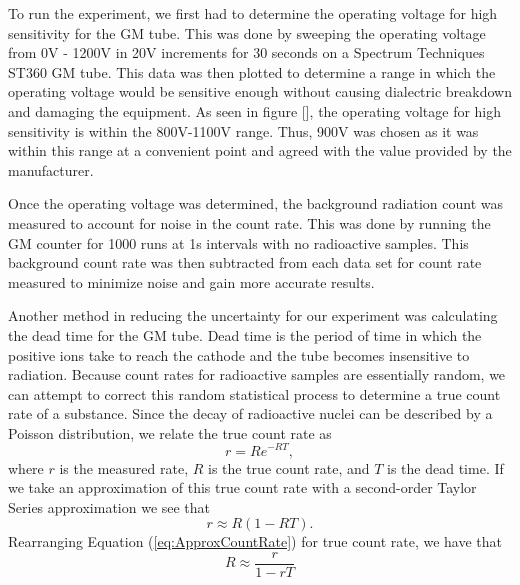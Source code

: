 
\par \indent To run the experiment, we first had to determine the operating voltage for high sensitivity for the GM tube. This was done by sweeping the operating voltage from 0V - 1200V in 20V increments for 30 seconds on a Spectrum Techniques ST360 GM tube. This data was then plotted to determine a range in which the operating voltage would be sensitive enough without causing dialectric breakdown and damaging the equipment. As seen in figure [], the operating voltage for high sensitivity is within the 800V-1100V range. Thus, 900V was chosen as it was within this range at a convenient point and agreed with the value provided by the manufacturer.

\par Once the operating voltage was determined, the background radiation count was measured to account for noise in the count rate. This was done by running the GM counter for 1000 runs at 1s intervals with no radioactive samples. This background count rate was then subtracted from each data set for count rate measured to minimize noise and gain more accurate results.

\par Another method in reducing the uncertainty for our experiment was calculating the dead time for the GM tube. Dead time is the period of time in which the positive ions take to reach the cathode and the tube becomes insensitive to radiation. Because count rates for radioactive samples are essentially random, we can attempt to correct this random statistical process to determine a true count rate of a substance.  Since the decay of radioactive nuclei can be described by a Poisson distribution, we relate the true count rate as
\begin{equation}
r = Re^{-RT}, 
\label{eq:ActualCountRate}
\end{equation}\cite{Spectrum}
where $r$ is the measured rate, $R$ is the true count rate, and $T$ is the dead time. If we take an approximation of this true count rate with a second-order Taylor Series approximation we see that
\begin{equation}
r \approx R(1-RT).
\label{eq:ApproxCountRate}
\end{equation}
Rearranging Equation (\ref{eq:ApproxCountRate}) for true count rate, we have that
\begin{equation}
R \approx \frac{r}{1-rT}
\label{eq:TrueCountRate}
\end{equation}

